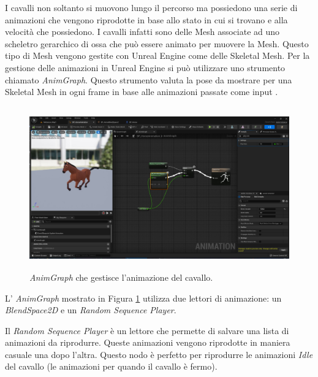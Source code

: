     I cavalli non soltanto si muovono lungo il percorso ma possiedono una serie di animazioni che vengono riprodotte in base allo stato in cui si trovano e alla velocità che possiedono.
    I cavalli infatti sono delle Mesh associate ad uno scheletro gerarchico di ossa che può essere animato per muovere la Mesh.
    Questo tipo di Mesh vengono gestite con Unreal Engine come delle Skeletal Mesh. 
    Per la gestione delle animazioni in Unreal Engine si può utilizzare uno strumento chiamato \textit{AnimGraph}.
    Questo strumento valuta la pose da mostrare per una Skeletal Mesh in ogni frame in base alle animazioni passate come input \cite{UAnimGraph}.

    \begin{figure}[!ht]
        \centering
        \includegraphics[height=7cm]{figure/HorseAnimGraph.JPG}
        \caption{\textit{AnimGraph} che gestisce l'animazione del cavallo.}
        \label{fig:AnimGraph}
    \end{figure}

    L' \textit{AnimGraph} mostrato in Figura \ref{fig:AnimGraph} utilizza due lettori di animazione: un \textit{BlendSpace2D} e un \textit{Random Sequence Player}.
    
    Il \textit{Random Sequence Player} è un lettore che permette di salvare una lista di animazioni da riprodurre.
    Queste animazioni vengono riprodotte in maniera casuale una dopo l'altra.
    Questo nodo è perfetto per riprodurre le animazioni \textit{Idle} del cavallo (le animazioni per quando il cavallo è fermo).

